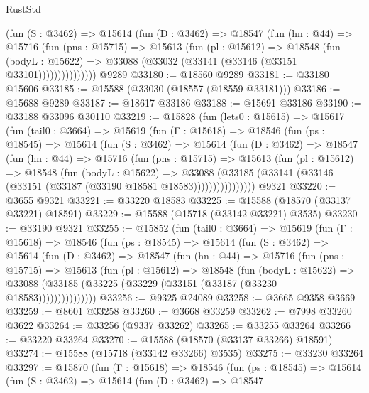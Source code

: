 \begin{lexlean}{RustStd}
\begin{coremodule}
              (fun (S : @3462) =>
              @15614
                (fun (D : @3462) =>
                @18547
                  (fun (hn : @44) =>
                  @15716
                    (fun (pns : @15715) =>
                    @15613
                      (fun (pl : @15612) =>
                      @18548
                        (fun (bodyL : @15622) =>
                        @33088 (@33032 (@33141 (@33146 (@33151 @33101)))))))))))))))
    @9289
@33180 := @18560 @9289
@33181 := @33180 @15606
@33185 := @15588 (@33030 (@18557 (@18559 @33181)))
@33186 := @15688 @9289
@33187 := @18617 @33186
@33188 := @15691 @33186
@33190 := @33188 @33096 @30110
@33219 := @15828
    (fun (lets0 : @15615) =>
    @15617
      (fun (tail0 : @3664) =>
      @15619
        (fun (Γ : @15618) =>
        @18546
          (fun (ps : @18545) =>
          @15614
            (fun (S : @3462) =>
            @15614
              (fun (D : @3462) =>
              @18547
                (fun (hn : @44) =>
                @15716
                  (fun (pns : @15715) =>
                  @15613
                    (fun (pl : @15612) =>
                    @18548
                      (fun (bodyL : @15622) =>
                      @33088
                        (@33185
                          (@33141 (@33146 (@33151 (@33187 (@33190 @18581 @18583))))))))))))))))
    @9321
@33220 := @3655 @9321
@33221 := @33220 @18583
@33225 := @15588 (@18570 (@33137 @33221) @18591)
@33229 := @15588 (@15718 (@33142 @33221) @3535)
@33230 := @33190 @9321
@33255 := @15852
    (fun (tail0 : @3664) =>
    @15619
      (fun (Γ : @15618) =>
      @18546
        (fun (ps : @18545) =>
        @15614
          (fun (S : @3462) =>
          @15614
            (fun (D : @3462) =>
            @18547
              (fun (hn : @44) =>
              @15716
                (fun (pns : @15715) =>
                @15613
                  (fun (pl : @15612) =>
                  @18548
                    (fun (bodyL : @15622) =>
                    @33088 (@33185 (@33225 (@33229 (@33151 (@33187 (@33230 @18583)))))))))))))))
@33256 := @9325 @24089
@33258 := @3665 @9358 @3669
@33259 := @8601 @33258
@33260 := @3668 @33259
@33262 := @7998 @33260 @3622
@33264 := @33256 (@9337 @33262)
@33265 := @33255 @33264
@33266 := @33220 @33264
@33270 := @15588 (@18570 (@33137 @33266) @18591)
@33274 := @15588 (@15718 (@33142 @33266) @3535)
@33275 := @33230 @33264
@33297 := @15870
    (fun (Γ : @15618) =>
    @18546
      (fun (ps : @18545) =>
      @15614
        (fun (S : @3462) =>
        @15614
          (fun (D : @3462) =>
          @18547

\end{coremodule}
\end{lexlean}
